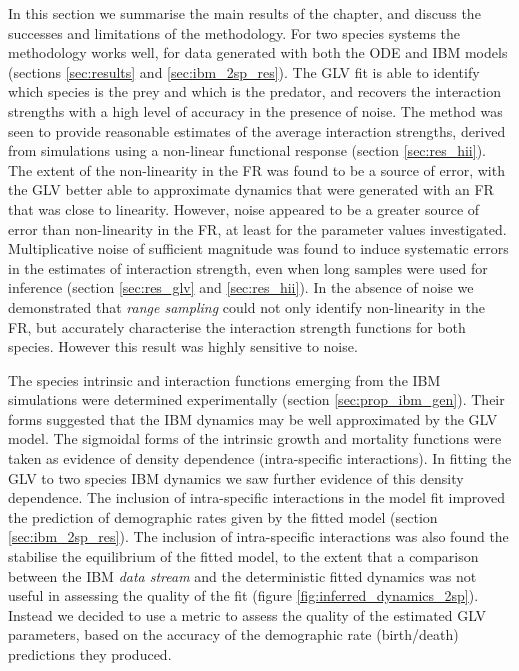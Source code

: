 In this section we summarise the main results of the chapter, and discuss the successes and limitations of the methodology. For two species systems the methodology works well, for data generated with both the ODE and IBM models (sections \ref{sec:results} and \ref{sec:ibm_2sp_res}). The GLV fit is able to identify which species is the prey and which is the predator, and recovers the interaction strengths with a high level of accuracy in the presence of noise. The method was seen to provide reasonable estimates of the average interaction strengths, derived from simulations using a non-linear functional response (section \ref{sec:res_hii}). The extent of the non-linearity in the FR was found to be a source of error, with the GLV better able to approximate dynamics that were generated with an FR that was close to linearity. However, noise appeared to be a greater source of error than non-linearity in the FR, at least for the parameter values investigated. Multiplicative noise of sufficient magnitude was found to induce systematic errors in the estimates of interaction strength, even when long samples were used for inference (section \ref{sec:res_glv} and \ref{sec:res_hii}). In the absence of noise we demonstrated that \emph{range sampling} could not only identify non-linearity in the FR, but accurately characterise the interaction strength functions for both species. However this result was highly sensitive to noise. 

The species intrinsic and interaction functions emerging from the IBM simulations were determined experimentally (section \ref{sec:prop_ibm_gen}). Their forms suggested that the IBM dynamics may be well approximated by the GLV model. The sigmoidal forms of the intrinsic growth and mortality functions were taken as evidence of density dependence (intra-specific interactions). In fitting the GLV to two species IBM dynamics we saw further evidence of this density dependence. The inclusion of intra-specific interactions in the model fit improved the prediction of demographic rates given by the fitted model (section \ref{sec:ibm_2sp_res}). The inclusion of intra-specific interactions was also found the stabilise the equilibrium of the fitted model, to the extent that a comparison between the IBM \emph{data stream} and the deterministic fitted dynamics was not useful in assessing the quality of the fit (figure \ref{fig:inferred_dynamics_2sp}). Instead we decided to use a metric to assess the quality of the estimated GLV parameters, based on the accuracy of the demographic rate (birth/death) predictions they produced. 

